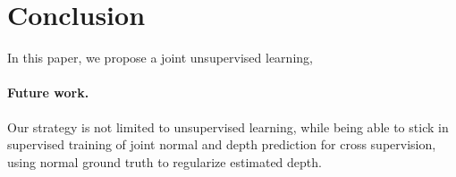 \section{Conclusion} 
In this paper, we propose a joint unsupervised learning, 

\paragraph{Future work.}
Our strategy is not limited to unsupervised learning, while being able to stick in supervised training of joint normal and depth prediction for cross supervision, \eg using normal ground truth to regularize estimated depth.